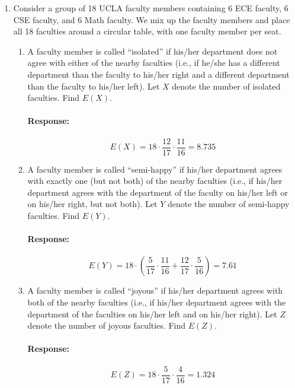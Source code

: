\documentclass [11pt] {article}
\newenvironment{response}{\begin{responseframe}\vspace{-10pt}\paragraph{Response:}}{\end{responseframe}}
\begin{document}
\begin{enumerate}
\begin{enumerate}
            \item Consider a group of 18 UCLA faculty members containing 6 ECE faculty,
                6 CSE faculty, and 6 Math faculty. We mix up the faculty members and place all 18
                faculties around a circular table, with one faculty member per seat.
                \begin{enumerate}[itemsep=10pt]
                    \item A faculty member is called ``isolated'' if his/her department does not
                        agree with either of the nearby faculties (i.e., if he/she has a different 
                        department than the faculty to his/her right and a different department 
                        than the faculty to his/her left). Let $X$ denote the number of isolated 
                        faculties. Find $E(X)$.
                        \begin{response}
                            \[E(X) = 18 \cdot \frac{12}{17} \cdot \frac{11}{16} = 8.735\] 
                        \end{response}
                    \item A faculty member is called ``semi-happy'' if his/her department agrees
                        with exactly one (but not both) of the nearby faculties (i.e., if his/her 
                        department agrees with the department of the faculty on his/her left or on 
                        his/her right, but not both). Let $Y$ denote the number of semi-happy 
                        faculties. Find $E(Y)$.
                        \begin{response}
                            \[E(Y) = 18 \cdot \left( \frac{5}{17} \cdot \frac{11}{16} + \frac{12}{17} \cdot \frac{5}{16}\right) = 7.61\]
                        \end{response}
                    \item A faculty member is called ``joyous'' if his/her department agrees with
                        both of the nearby faculties (i.e., if his/her department agrees with the 
                        department of the faculties on his/her left and on his/her right). Let $Z$ 
                        denote the number of joyous faculties. Find $E(Z)$.
                        \begin{response}
                            \[E(Z) = 18 \cdot \frac{5}{17} \cdot \frac{4}{16} = 1.324\]
                        \end{response}
                \end{enumerate}


\end{enumerate}
\end{enumerate}
\end{document}
